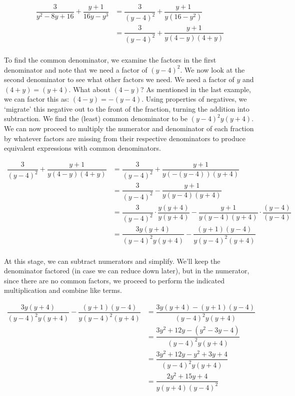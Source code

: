 \begin{ex}
\begin{enumerate}
\begin{align*}
\dfrac{3}{y^2 - 8y + 16} + \dfrac{y+1}{16y - y^3} & = \dfrac{3}{(y-4)^2} + \dfrac{y+1}{y(16 - y^2)} \tag{Factor} \\			
& = \dfrac{3}{(y-4)^2} + \dfrac{y+1}{y(4-y)(4+y)} \tag{Factor some more} \\
\end{align*}

To find the common denominator, we examine the factors in the first denominator and note that we need a factor of $(y-4)^2$.  We now look at the second denominator to see what other factors we need. We need a factor of $y$ and $(4+y) = (y+4)$.  What about $(4-y)$?  As mentioned in the last example, we can factor this as: $(4-y) = -(y-4)$. Using properties of negatives, we `migrate' this negative out to the front of the fraction, turning the addition into subtraction.  We find the (least) common denominator to be $(y-4)^2 y (y+4)$.  We can now proceed to multiply the numerator and denominator of each fraction by whatever factors are missing from their respective denominators to produce equivalent expressions with common denominators.

\begin{align*}
\dfrac{3}{(y-4)^2} + \dfrac{y+1}{y(4-y)(4+y)} & = \dfrac{3}{(y-4)^2} + \dfrac{y+1}{y(-(y-4))(y+4)} \\ 
& = \dfrac{3}{(y-4)^2} - \dfrac{y+1}{y(y-4)(y+4)} \\ 
& = \dfrac{3}{(y-4)^2} \cdot \dfrac{y(y+4)}{y(y+4)} - \dfrac{y+1}{y(y-4)(y+4)} \cdot \dfrac{(y-4)}{(y-4)} \tag{Equivalent Fractions} \\
& = \dfrac{3y(y+4)}{(y-4)^2y(y+4)}  - \dfrac{(y+1)(y-4)}{y(y-4)^2(y+4)}  \tag{Multiply Fractions} \\ 
\end{align*}

At this stage, we can subtract numerators and simplify. We'll keep the denominator factored (in case we can reduce down later), but in the numerator, since there are no common factors, we proceed to perform the indicated multiplication and combine like terms.

\begin{align*}
 \dfrac{3y(y+4)}{(y-4)^2y(y+4)}  - \dfrac{(y+1)(y-4)}{y(y-4)^2(y+4)} & =  \dfrac{3y(y+4) -(y+1)(y-4)}{(y-4)^2y(y+4)}  \tag{Subtract numerators} \\ 
& = \dfrac{3y^2 + 12y - (y^2 - 3y - 4)}{(y-4)^2 y (y+4)} \tag{Distribute} \\ 
& = \dfrac{3y^2 + 12y - y^2 + 3y + 4}{(y-4)^2 y (y+4)} \tag{Distribute} \\ 
& = \dfrac{2y^2 + 15y + 4}{y (y+4) (y-4)^2} \tag{Gather like terms} \\
\end{align*}


\end{enumerate}
\end{ex}
